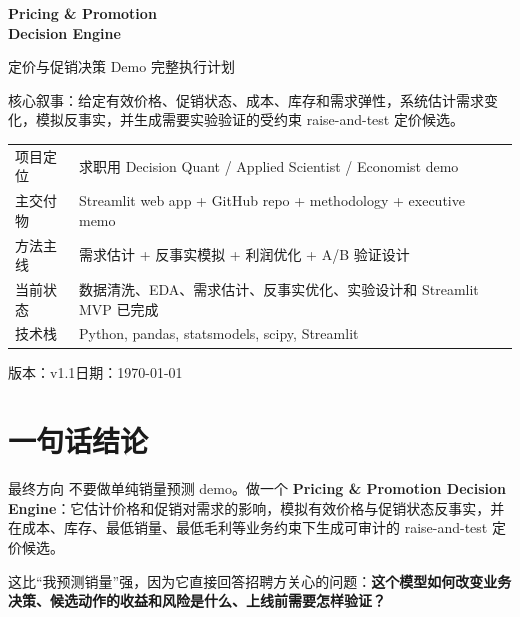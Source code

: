 \documentclass[UTF8,11pt,a4paper,fontset=none]{ctexart}
\begin{document}
\begin{titlepage}
\centering
\vspace*{1.8cm}
{\Huge\bfseries\color{navy} Pricing \& Promotion\\Decision Engine\par}
\vspace{0.6cm}
{\Large 定价与促销决策 Demo 完整执行计划\par}
\vspace{1.1cm}
\begin{tcolorbox}[width=0.86\textwidth,colback=lightsteel,colframe=navy]
\large
核心叙事：给定有效价格、促销状态、成本、库存和需求弹性，系统估计需求变化，模拟反事实，并生成需要实验验证的受约束 raise-and-test 定价候选。
\end{tcolorbox}
\vspace{0.8cm}
\begin{tabular}{ll}
\toprule
项目定位 & 求职用 Decision Quant / Applied Scientist / Economist demo \\
主交付物 & Streamlit web app + GitHub repo + methodology + executive memo \\
方法主线 & 需求估计 + 反事实模拟 + 利润优化 + A/B 验证设计 \\
当前状态 & 数据清洗、EDA、需求估计、反事实优化、实验设计和 Streamlit MVP 已完成 \\
技术栈 & Python, pandas, statsmodels, scipy, Streamlit \\
\bottomrule
\end{tabular}
\vfill
{\large 版本：v1.1\quad 日期：\today\par}
\end{titlepage}

\setcounter{tocdepth}{1}
{\small\setlength{\parskip}{0pt}\tableofcontents}
\newpage

\section{一句话结论}

\begin{decisionbox}{最终方向}
不要做单纯销量预测 demo。做一个 \textbf{Pricing \& Promotion Decision Engine}：它估计价格和促销对需求的影响，模拟有效价格与促销状态反事实，并在成本、库存、最低销量、最低毛利等业务约束下生成可审计的 raise-and-test 定价候选。
\end{decisionbox}

这比“我预测销量”强，因为它直接回答招聘方关心的问题：\textbf{这个模型如何改变业务决策、候选动作的收益和风险是什么、上线前需要怎样验证？}
\end{document}
